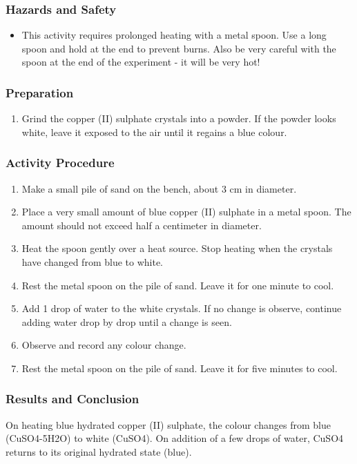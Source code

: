 \subsubsection*{Hazards and Safety}
\begin{itemize}
\item{This activity requires prolonged heating with a metal spoon. Use a long spoon and hold at the end to prevent burns. Also be very careful with the spoon at the end of the experiment - it will be very hot!}
\end{itemize}

\subsubsection*{Preparation}
\begin{enumerate}
\item{Grind the copper (II) sulphate crystals into a powder. If the powder looks white, leave it exposed to the air until it regains a blue colour.}
\end{enumerate}

\subsubsection*{Activity Procedure}
\begin{enumerate}
\item{Make a small pile of sand on the bench, about 3 cm in diameter.}
\item{Place a very small amount of blue copper (II) sulphate in a metal spoon. The amount should not exceed half a centimeter in diameter.}
\item{Heat the spoon gently over a heat source. Stop heating when the crystals have changed from blue to white.}
\item{Rest the metal spoon on the pile of sand. Leave it for one minute to cool.}
\item{Add 1 drop of water to the white crystals. If no change is observe, continue adding water drop by drop until a change is seen.}
\item{Observe and record any colour change.}
\item{Rest the metal spoon on the pile of sand. Leave it for five minutes to cool.}
\end{enumerate}

\subsubsection*{Results and Conclusion}
On heating blue hydrated copper (II) sulphate, the colour changes from blue (CuSO4-5H2O) to white (CuSO4). On addition of a few drops of water, CuSO4 returns to its original hydrated state (blue).

